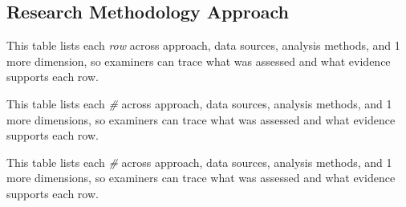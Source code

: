 \subsection{Research Methodology Approach}
\label{sec:research_methodology_approach}


\noindent This table lists each \textit{row} across approach, data sources, analysis methods, and 1 more dimension, so examiners can trace what was assessed and what evidence supports each row.



\noindent This table lists each \textit{\#} across approach, data sources, analysis methods, and 1 more dimensions, so examiners can trace what was assessed and what evidence supports each row.


\noindent This table lists each \textit{\#} across approach, data sources, analysis methods, and 1 more dimensions, so examiners can trace what was assessed and what evidence supports each row.



